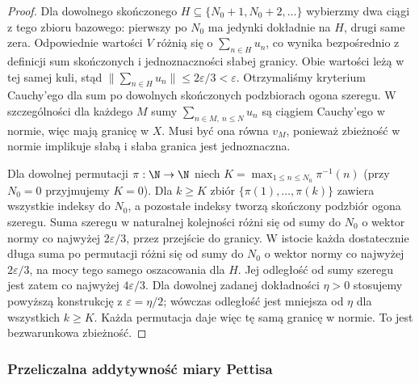 \begin{proof}
Dla dowolnego skończonego
$H\subseteq\{N_0+1,N_0+2,\ldots\}$ wybierzmy dwa ciągi
z tego zbioru bazowego: pierwszy po $N_0$ ma jedynki
dokładnie na $H$, drugi same zera. Odpowiednie wartości
$V$ różnią się o $\sum_{n\in H}u_n$, co wynika
bezpośrednio z definicji sum skończonych i jednoznaczności
słabej granicy. Obie wartości leżą w tej samej kuli,
stąd
$\|\sum_{n\in H}u_n\|\le2\varepsilon/3<\varepsilon$.
Otrzymaliśmy kryterium Cauchy'ego dla sum po dowolnych
skończonych podzbiorach ogona szeregu. W szczególności
dla każdego $M$ sumy $\sum_{n\in M,\ n\le N}u_n$
są ciągiem Cauchy'ego w normie, więc mają granicę w $X$.
Musi być ona równa $v_M$, ponieważ zbieżność w normie
implikuje słabą i słaba granica jest jednoznaczna.

Dla dowolnej permutacji $\pi:\N\to\N$ niech
$K=\max_{1\le n\le N_0}\pi^{-1}(n)$ (przy $N_0=0$
przyjmujemy $K=0$). Dla $k\ge K$ zbiór
$\{\pi(1),\ldots,\pi(k)\}$ zawiera wszystkie indeksy
do $N_0$, a pozostałe indeksy tworzą skończony podzbiór
ogona szeregu. Suma szeregu w naturalnej kolejności
różni się od sumy do $N_0$ o wektor normy co najwyżej
$2\varepsilon/3$, przez przejście do granicy.
W istocie każda dostatecznie długa suma po permutacji
różni się od sumy do $N_0$ o wektor normy co najwyżej
$2\varepsilon/3$, na mocy tego samego oszacowania dla $H$.
Jej odległość od sumy szeregu jest zatem co najwyżej
$4\varepsilon/3$. Dla dowolnej zadanej dokładności
$\eta>0$ stosujemy powyższą konstrukcję z
$\varepsilon=\eta/2$; wówczas odległość jest mniejsza
od $\eta$ dla wszystkich $k\ge K$. Każda permutacja
daje więc tę samą granicę w normie.
To jest bezwarunkowa zbieżność.
\end{proof}

\subsubsection{Przeliczalna addytywność miary Pettisa}

